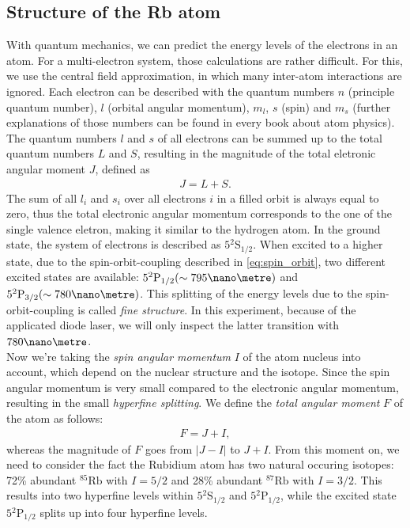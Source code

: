 \subsection{Structure of the Rb atom}
With quantum mechanics, we can predict the energy levels of the electrons in an atom. For a multi-electron system, those calculations are rather difficult. For this, we use the central field approximation, in which many inter-atom interactions are ignored. Each electron can be described with the quantum numbers $n$ (principle quantum number), $l$ (orbital angular momentum), $m_l$, $s$ (spin) and $m_s$ (further explanations of those numbers can be found in every book about atom physics). The quantum numbers $l$ and $s$ of all electrons can be summed up to the total quantum numbers $L$ and $S$, resulting in the magnitude of the total eletronic angular moment $J$, defined as
\begin{align}
J=L+S.
\label{eq:spin_orbit}
\end{align}
The sum of all $l_i$ and $s_i$ over all electrons $i$ in a filled orbit is always equal to zero, thus the total electronic angular momentum corresponds to the one of the single valence eletron, making it similar to the hydrogen atom. In the ground state, the system of electrons is described as $5{}^2\mathrm{S}_{1/2}$. When excited to a higher state, due to the spin-orbit-coupling described in \eqref{eq:spin_orbit}, two different excited states are available: $5{}^2\mathrm{P}_{1/2} (\sim 795 \nano\metre)$ and $5{}^2\mathrm{P}_{3/2} (\sim 780\nano\metre)$. This splitting of the energy levels due to the spin-orbit-coupling is called \emph{
fine structure}. In this experiment, because of the applicated diode laser, we will only inspect the latter transition with $780\nano\metre$.\\
Now we're taking the \emph{spin angular momentum} $I$ of the atom nucleus into account, which depend on the nuclear structure and the isotope. Since the spin angular momentum is very small compared to the electronic angular momentum, resulting in the small \emph{hyperfine splitting}. We define the \emph{total angular moment} $F$ of the atom as follows:
\begin{align}
F=J+I,
\end{align}
whereas the magnitude of $F$ goes from $|J-I|$ to $J+I$.
From this moment on, we need to consider the fact the Rubidium atom has two natural occuring  isotopes: 72\% abundant $^{85}\text{Rb}$ with $I=5/2$ and 28\% abundant $^{87}\text{Rb}$ with $I=3/2$. This results into two hyperfine levels within $5{}^2\mathrm{S}_{1/2}$ and $5{}^2\mathrm{P}_{1/2}$, while the excited state $5{}^2\mathrm{P}_{1/2}$ splits up into four hyperfine levels.
